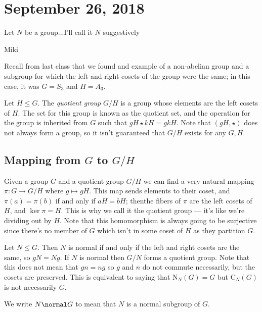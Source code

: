 \section{September 26, 2018}

\epigraph{Let $N$ be a group...I'll call it $N$ suggestively}{Miki}

Recall from last class that we found and example of a non-abelian group and a subgroup for which the left and right cosets of the group were the same; in this case, it was $G = S_3$ and $H = A_3$.

\begin{definition}
Let $H \leq G$. The \emph{quotient group} $G/H$ is a group whose elements are the left cosets of $H$. The set for this group is known as the quotient set, and the operation for the group is inherited from $G$ such that $gH \star kH = gk H$. Note that $(gH, \star)$ does not always form a group, so it isn't guaranteed that $G/H$ exists for any $G,H$. 
\end{definition}

\subsection{Mapping from \texorpdfstring{$G$}{G} to \texorpdfstring{$G/H$}{G/H}}

Given a group $G$ and a quotient group $G/H$ we can find a very natural mapping $\pi : G \to G/H$ where $g \mapsto gH$. This map sends elements to their coset, and $\pi(a) = \pi(b)$ if and only if $aH = bH$; thenthe fibers of $\pi$ are the left cosets of $H$, and $\ker \pi = H$. This is why we call it the quotient group --- it's like we're dividing out by $H$. Note that this homomorphism is always going to be surjective since there's no member of $G$ which isn't in some coset of $H$ as they partition $G$.

\begin{definition}
Let $N \leq G$. Then $N$ is normal if and only if the left and right cosets are the same, so $gN = Ng$. If $N$ is normal then $G/N$ forms a quotient group. Note that this does not mean that $gn = ng$ so $g$ and $n$ do not commute necessarily, but the cosets are preserved. This is equivalent to saying that $\mathrm{N}_N(G) = G$ but $\mathrm{C}_N(G)$ is not necessarily $G$.
\end{definition}

\begin{notation}[$\normal$]
We write $N \normal G$ to mean that $N$ is a normal subgroup of $G$.
\end{notation}

